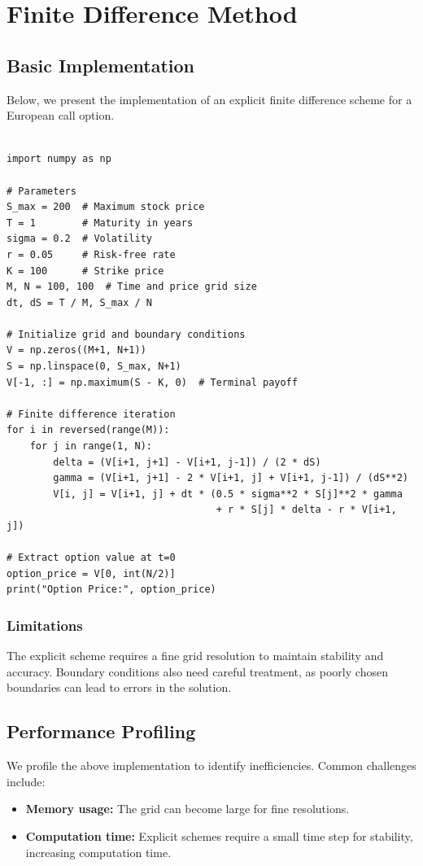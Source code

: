 \documentclass[12pt,a4paper]{report}
\begin{document}
\section{Finite Difference Method}

\subsection{Basic Implementation}
Below, we present the implementation of an explicit finite difference scheme for a European call option. 

\begin{tcolorbox}[colframe=blue!50!black, colback=blue!5, title=Explicit Finite Difference Scheme]

\begin{verbatim}

import numpy as np

# Parameters
S_max = 200  # Maximum stock price
T = 1        # Maturity in years
sigma = 0.2  # Volatility
r = 0.05     # Risk-free rate
K = 100      # Strike price
M, N = 100, 100  # Time and price grid size
dt, dS = T / M, S_max / N

# Initialize grid and boundary conditions
V = np.zeros((M+1, N+1))
S = np.linspace(0, S_max, N+1)
V[-1, :] = np.maximum(S - K, 0)  # Terminal payoff

# Finite difference iteration
for i in reversed(range(M)):
    for j in range(1, N):
        delta = (V[i+1, j+1] - V[i+1, j-1]) / (2 * dS)
        gamma = (V[i+1, j+1] - 2 * V[i+1, j] + V[i+1, j-1]) / (dS**2)
        V[i, j] = V[i+1, j] + dt * (0.5 * sigma**2 * S[j]**2 * gamma 
                                    + r * S[j] * delta - r * V[i+1, j])

# Extract option value at t=0
option_price = V[0, int(N/2)]
print("Option Price:", option_price)
\end{verbatim}
\end{tcolorbox}

\subsubsection{Limitations}
The explicit scheme requires a fine grid resolution to maintain stability and accuracy. Boundary conditions also need careful treatment, as poorly chosen boundaries can lead to errors in the solution.

\subsection{Performance Profiling}
We profile the above implementation to identify inefficiencies. Common challenges include:
\begin{itemize}
    \item \textbf{Memory usage:} The grid can become large for fine resolutions.
    \item \textbf{Computation time:} Explicit schemes require a small time step for stability, increasing computation time.
\end{itemize}
\end{document}
